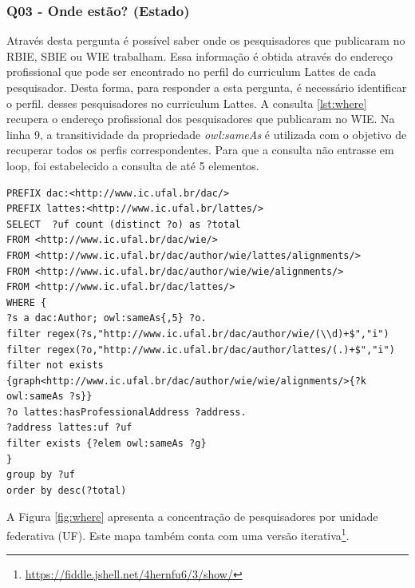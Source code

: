 \subsubsection{Q03 - Onde estão? (Estado)}
Através desta pergunta é possível saber onde os pesquisadores que publicaram no RBIE, SBIE ou WIE trabalham. Essa informação é obtida através do endereço profissional que pode ser encontrado no perfil do curriculum Lattes de cada pesquisador. Desta forma, para responder a esta pergunta, é necessário identificar o perfil. desses pesquisadores no curriculum Lattes.
A consulta \ref{lst:where} recupera o endereço profissional dos pesquisadores que publicaram no WIE. Na linha 9, a transitividade da propriedade \textit{owl:sameAs} é utilizada com o objetivo de recuperar todos os perfis correspondentes. Para que a consulta não entrasse em loop, foi estabelecido a consulta de até 5 elementos.

\begin{lstlisting}[captionpos=b, caption= Consulta para recuperar a concentração de pesquisadores por UF, label=lst:where,
basicstyle=\ttfamily,frame=single]
PREFIX dac:<http://www.ic.ufal.br/dac/>
PREFIX lattes:<http://www.ic.ufal.br/lattes/>
SELECT  ?uf count (distinct ?o) as ?total
FROM <http://www.ic.ufal.br/dac/wie/>
FROM <http://www.ic.ufal.br/dac/author/wie/lattes/alignments/>
FROM <http://www.ic.ufal.br/dac/author/wie/wie/alignments/>
FROM <http://www.ic.ufal.br/dac/lattes/>
WHERE {
?s a dac:Author; owl:sameAs{,5} ?o.
filter regex(?s,"http://www.ic.ufal.br/dac/author/wie/(\\d)+$","i")
filter regex(?o,"http://www.ic.ufal.br/dac/author/lattes/(.)+$","i")
filter not exists {graph<http://www.ic.ufal.br/dac/author/wie/wie/alignments/>{?k owl:sameAs ?s}}
?o lattes:hasProfessionalAddress ?address.
?address lattes:uf ?uf
filter exists {?elem owl:sameAs ?g}
}
group by ?uf
order by desc(?total)

\end{lstlisting}

A Figura \ref{fig:where} apresenta a concentração de pesquisadores por unidade federativa (UF). Este mapa também conta com uma versão iterativa\footnote{\url{https://fiddle.jshell.net/4hernfu6/3/show/}}.

